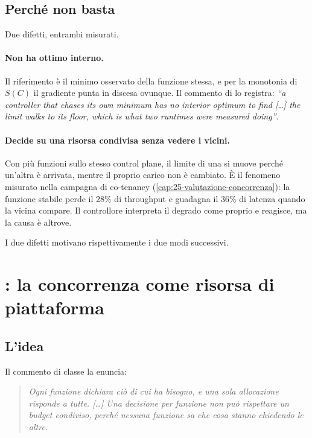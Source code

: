 \subsection{Perch\'e non basta}

Due difetti, entrambi misurati.

\paragraph{Non ha ottimo interno.} Il riferimento \`e il minimo osservato della
funzione stessa, e per la monotonia di $S(C)$ il gradiente punta in discesa
ovunque. Il commento di  lo registra: \emph{``a
controller that chases its own minimum has no interior optimum to find [\ldots]
the limit walks to its floor, which is what two runtimes were measured doing''}.

\paragraph{Decide su una risorsa condivisa senza vedere i vicini.} Con pi\`u
funzioni sullo stesso control plane, il limite di una si muove perch\'e un'altra
\`e arrivata, mentre il proprio carico non \`e cambiato. \`E il fenomeno misurato
nella campagna di co-tenancy (\cref{cap:25-valutazione-concorrenza}): la funzione
stabile perde il 28\% di throughput e guadagna il 36\% di latenza quando la
vicina compare. Il controllore interpreta il degrado come proprio e reagisce, ma
la causa \`e altrove.

I due difetti motivano rispettivamente i due modi successivi.

\section{: la concorrenza come risorsa di piattaforma}

\subsection{L'idea}

Il commento di classe la enuncia:

\begin{quote}\itshape
Ogni funzione dichiara ci\`o di cui ha bisogno, e una sola allocazione risponde a
tutte. [\ldots] Una decisione per funzione non pu\`o rispettare un budget
condiviso, perch\'e nessuna funzione sa che cosa stanno chiedendo le altre.
\end{quote}

